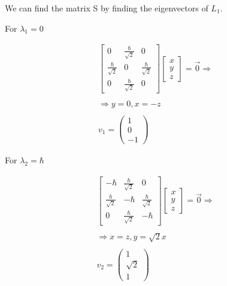 We can find the matrix S by finding the eigenvectors of $L_1$.

For $\lambda_1 = 0$

\begin{equation}
  \begin{array}{c}
    \left[\begin{matrix}
      0 & \frac{\hbar}{\sqrt{2}} & 0\\
      \frac{\hbar}{\sqrt{2}} & 0 & \frac{\hbar}{\sqrt{2}}\\
      0 & \frac{\hbar}{\sqrt{2}} & 0
    \end{matrix}\right]\left[\begin{matrix}
      x\\
      y\\
      z
    \end{matrix}\right] = \vec{0} \Rightarrow
    \\

    \\
    \Rightarrow y = 0, x = -z
    \\

    \\
    v_1 = \left( \begin{matrix}
      1\\
      0\\
      -1
    \end{matrix}\right)
  \end{array}
\end{equation}

For $\lambda_2 = \hbar$

\begin{equation}
  \begin{array}{c}
    \left[\begin{matrix}
      -\hbar & \frac{\hbar}{\sqrt{2}} & 0\\
      \frac{\hbar}{\sqrt{2}} & -\hbar & \frac{\hbar}{\sqrt{2}}\\
      0 & \frac{\hbar}{\sqrt{2}} & -\hbar
    \end{matrix}\right]
    \left[\begin{matrix}
      x\\
      y\\
      z
    \end{matrix}\right] = \vec{0} \Rightarrow
    \\

    \\
    \Rightarrow x = z, y = \sqrt{2}x
    \\

    \\
    v_2 = \left(\begin{matrix}
      1\\
      \sqrt{2}\\
      1
    \end{matrix}\right)
  \end{array}
\end{equation}

